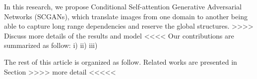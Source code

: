 In this research, we propose Conditional Self-attention Generative Adversarial Networks (SCGANs), which translate images from one domain to another being able to capture long range dependencies and reserve the global structures. >>>> Discuss more details of the results and model <<<< Our contributions are summarized as follow:
i) 
ii)
iii)

The rest of this article is organized as follow. Related works are presented in Section >>>> more detail <<<<<